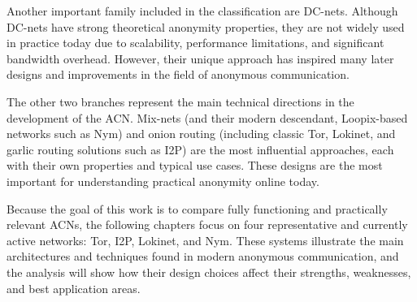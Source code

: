 Another important family included in the classification are DC-nets. Although DC-nets have strong theoretical anonymity properties, they are not widely used in practice today due to scalability, performance limitations, and significant bandwidth overhead. However, their unique approach has inspired many later designs and improvements in the field of anonymous communication.

The other two branches represent the main technical directions in the development of the ACN. Mix-nets (and their modern descendant, Loopix-based networks such as Nym) and onion routing (including classic Tor, Lokinet, and garlic routing solutions such as I2P) are the most influential approaches, each with their own properties and typical use cases. These designs are the most important for understanding practical anonymity online today.

Because the goal of this work is to compare fully functioning and practically relevant ACNs, the following chapters focus on four representative and currently active networks: Tor, I2P, Lokinet, and Nym. These systems illustrate the main architectures and techniques found in modern anonymous communication, and the analysis will show how their design choices affect their strengths, weaknesses, and best application areas.
